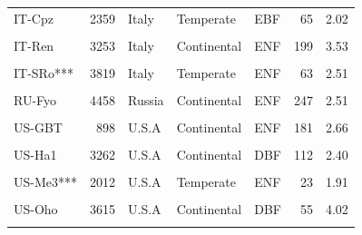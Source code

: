 \begin{table}[!h]
\begin{tabular}[t]{lrlllrr}
IT-Cpz & 2359 & Italy & Temperate & EBF & 65 & 2.02\\
\addlinespace
\cellcolor{gray!10}{IT-PT1} & \cellcolor{gray!10}{897} & \cellcolor{gray!10}{Italy} & \cellcolor{gray!10}{Temperate} & \cellcolor{gray!10}{DBF} & \cellcolor{gray!10}{15} & \cellcolor{gray!10}{3.51}\\
IT-Ren & 3253 & Italy & Continental & ENF & 199 & 3.53\\
\cellcolor{gray!10}{IT-SR2} & \cellcolor{gray!10}{716} & \cellcolor{gray!10}{Italy} & \cellcolor{gray!10}{Temperate} & \cellcolor{gray!10}{ENF} & \cellcolor{gray!10}{65} & \cellcolor{gray!10}{2.21}\\
IT-SRo*** & 3819 & Italy & Temperate & ENF & 63 & 2.51\\
\cellcolor{gray!10}{NL-Loo} & \cellcolor{gray!10}{4498} & \cellcolor{gray!10}{Netherlands} & \cellcolor{gray!10}{Temperate} & \cellcolor{gray!10}{ENF} & \cellcolor{gray!10}{119} & \cellcolor{gray!10}{2.64}\\
\addlinespace
RU-Fyo & 4458 & Russia & Continental & ENF & 247 & 2.51\\
\cellcolor{gray!10}{US-Blo} & \cellcolor{gray!10}{1901} & \cellcolor{gray!10}{U.S.A} & \cellcolor{gray!10}{Temperate} & \cellcolor{gray!10}{ENF} & \cellcolor{gray!10}{21} & \cellcolor{gray!10}{4.04}\\
US-GBT & 898 & U.S.A & Continental & ENF & 181 & 2.66\\
\cellcolor{gray!10}{US-GLE} & \cellcolor{gray!10}{3638} & \cellcolor{gray!10}{U.S.A} & \cellcolor{gray!10}{Continental} & \cellcolor{gray!10}{ENF} & \cellcolor{gray!10}{190} & \cellcolor{gray!10}{2.36}\\
US-Ha1 & 3262 & U.S.A & Continental & DBF & 112 & 2.40\\
\addlinespace
\cellcolor{gray!10}{US-MMS} & \cellcolor{gray!10}{4538} & \cellcolor{gray!10}{U.S.A} & \cellcolor{gray!10}{Temperate} & \cellcolor{gray!10}{DBF} & \cellcolor{gray!10}{105} & \cellcolor{gray!10}{3.23}\\
US-Me3*** & 2012 & U.S.A & Temperate & ENF & 23 & 1.91\\
\cellcolor{gray!10}{US-NR1} & \cellcolor{gray!10}{4550} & \cellcolor{gray!10}{U.S.A} & \cellcolor{gray!10}{Continental} & \cellcolor{gray!10}{ENF} & \cellcolor{gray!10}{121} & \cellcolor{gray!10}{2.71}\\
US-Oho & 3615 & U.S.A & Continental & DBF & 55 & 4.02\\
\cellcolor{gray!10}{US-PFa} & \cellcolor{gray!10}{4522} & \cellcolor{gray!10}{U.S.A} & \cellcolor{gray!10}{Continental} & \cellcolor{gray!10}{MF} & \cellcolor{gray!10}{164} & \cellcolor{gray!10}{2.35}\\

\end{tabular}
\end{table}
